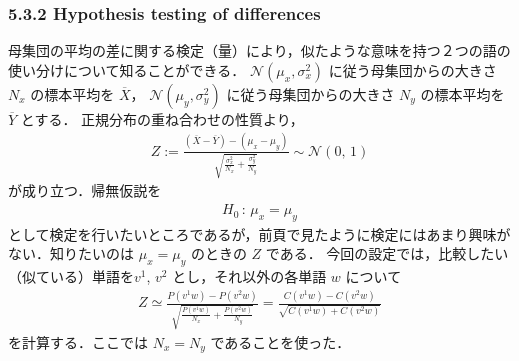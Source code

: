 \documentclass[9pt,leqno]{beamer}
\begin{document}
\begin{frame}
    \frametitle{5.3.2 Hypothesis testing of differences}
    母集団の平均の差に関する検定（量）により，似たような意味を持つ２つの語の使い分けについて知ることができる．
    $\mathcal{N}(\mu_x, \sigma_x^2)$ に従う母集団からの大きさ $N_x$ の標本平均を $\overline{X}$，
    $\mathcal{N}(\mu_y, \sigma_y^2)$ に従う母集団からの大きさ $N_y$ の標本平均を $\overline{Y}$ とする．
    正規分布の重ね合わせの性質より，
    \begin{align*}
        Z := \frac{\left(\overline{X} - \overline{Y}\right) - \left(\mu_x - \mu_y \right)}{{\displaystyle \sqrt{\frac{\sigma_x^2}{N_x} + \frac{\sigma_y^2}{N_y}}}} \sim \mathcal{N}(0,\,1)
    \end{align*}
    が成り立つ．帰無仮説を
    \begin{align*}
        H_0 \,:\, \mu_x = \mu_y
    \end{align*}
    として検定を行いたいところであるが，前頁で見たように検定にはあまり興味がない．知りたいのは $\mu_x = \mu_y$ のときの $Z$ である．
    今回の設定では，比較したい（似ている）単語を$v^1$, $v^2$ とし，それ以外の各単語 $w$ について
    \begin{align*}
        Z \simeq \frac{P\left(v^1 w\right) - P\left(v^2 w\right)}{{\displaystyle \sqrt{\frac{P\left(v^1 w\right)}{N_x} + \frac{P\left(v^2 w\right)}{N_y}}}}
        = \frac{C\left(v^1 w\right) - C\left(v^2 w\right)}{\sqrt{C\left(v^1 w\right) + C\left(v^2 w\right)}}
    \end{align*}
    を計算する．ここでは $N_x = N_y$ であることを使った．

\end{frame}
\end{document}
